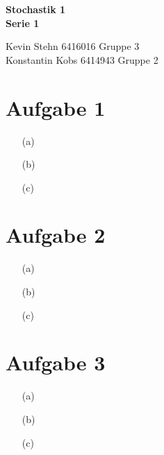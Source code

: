 \documentclass[10pt,a4paper]{article}
\begin{document}
\begin{center}
\textbf{Stochastik 1 \\ Serie 1 \\}
\end{center}

\begin{flushright}
Kevin Stehn 6416016 Gruppe 3 \\
Konstantin Kobs 6414943 Gruppe 2
\end{flushright}

\section*{Aufgabe 1}
\begin{itemize}
\item[(a)]
\item[(b)]
\item[(c)]
\end{itemize}

\section*{Aufgabe 2}
\begin{itemize}
\item[(a)]
\item[(b)]
\item[(c)]
\end{itemize}

\section*{Aufgabe 3}
\begin{itemize}
\item[(a)]
\item[(b)]
\item[(c)]
\end{itemize}
\end{document}
